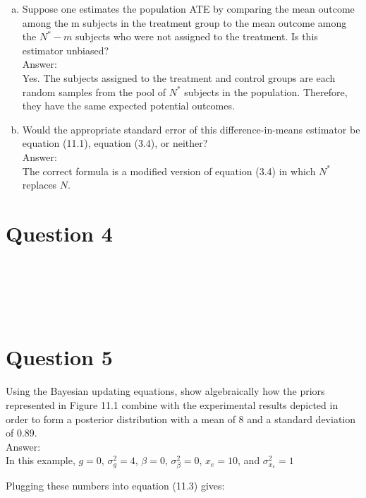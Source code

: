 \documentclass[11pt,notitlepage]{article}\usepackage[]{graphicx}\usepackage[]{color}
\makeatletter
\newenvironment{kframe}{%
 \def\at@end@of@kframe{}%
 \ifinner\ifhmode%
  \def\at@end@of@kframe{\end{minipage}}%
  \begin{minipage}{\columnwidth}%
 \fi\fi%
 \def\FrameCommand##1{\hskip\@totalleftmargin \hskip-\fboxsep
 \colorbox{shadecolor}{##1}\hskip-\fboxsep
     \hskip-\linewidth \hskip-\@totalleftmargin \hskip\columnwidth}%
 \MakeFramed {\advance\hsize-\width
   \@totalleftmargin\z@ \linewidth\hsize
   \@setminipage}}%
 {\par\unskip\endMakeFramed%
 \at@end@of@kframe}
\newenvironment{knitrout}{}{} %
\makeatother
\begin{document}
\begin{enumerate}[a)]
\item Suppose one estimates the population ATE by comparing the mean outcome among the m subjects in the treatment group to the mean outcome among the $N^* - m$ subjects who were not assigned to the treatment. Is this estimator unbiased?\\
Answer:\\
Yes. The subjects assigned to the treatment and control groups are each random samples from the pool of $N^*$ subjects in the population.  Therefore, they have the same expected potential outcomes.
\item Would the appropriate standard error of this difference-in-means estimator be equation (11.1), equation (3.4), or neither?\\
Answer:\\
The correct formula is a modified version of equation (3.4) in which $N^*$ replaces $N$.
\end{enumerate}


\section*{Question 4}
\begin{knitrout}
\color{fgcolor}\begin{kframe}
\begin{verbatim}





\end{verbatim}
\end{kframe}
\end{knitrout}



\section*{Question 5}
Using the Bayesian updating equations, show algebraically how the priors represented in Figure 11.1 combine with the experimental results depicted in order to form a posterior distribution with a mean of 8 and a standard deviation of 0.89.\\
Answer:\\
In this example, $g=0$, $\sigma^2_g = 4$, $\beta = 0$, $\sigma^2_{\beta} = 0$, $x_e = 10$, and $\sigma^2_{x_e} = 1$

Plugging these numbers into equation (11.3) gives: 
\end{document}
